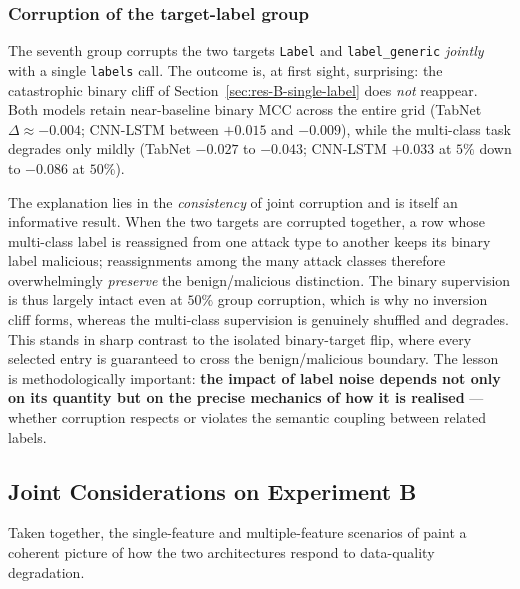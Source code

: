 \documentclass[../main.tex]{subfiles}
\begin{document}
\subsubsection{Corruption of the target-label group}
\label{sec:res-B-multi-label}

The seventh group corrupts the two targets \texttt{Label} and \texttt{label\_generic} \emph{jointly} with a single \texttt{labels} call. The outcome is, at first sight, surprising: the catastrophic binary cliff of Section~\ref{sec:res-B-single-label} does \emph{not} reappear. Both models retain near-baseline binary MCC across the entire grid (TabNet $\Delta \approx -0.004$; CNN-LSTM between $+0.015$ and $-0.009$), while the multi-class task degrades only mildly (TabNet $-0.027$ to $-0.043$; CNN-LSTM $+0.033$ at $5\%$ down to $-0.086$ at $50\%$).

The explanation lies in the \emph{consistency} of joint corruption and is itself an informative result. When the two targets are corrupted together, a row whose multi-class label is reassigned from one attack type to another keeps its binary label malicious; reassignments among the many attack classes therefore overwhelmingly \emph{preserve} the benign/malicious distinction. The binary supervision is thus largely intact even at $50\%$ group corruption, which is why no inversion cliff forms, whereas the multi-class supervision is genuinely shuffled and degrades. This stands in sharp contrast to the isolated binary-target flip, where every selected entry is guaranteed to cross the benign/malicious boundary. The lesson is methodologically important: \textbf{the impact of label noise depends not only on its quantity but on the precise mechanics of how it is realised} --- whether corruption respects or violates the semantic coupling between related labels.

\newpage
\subsection{Joint Considerations on Experiment B}
\label{sec: Cumulative BreakEven Point Test}

Taken together, the single-feature and multiple-feature scenarios of  paint a coherent picture of how the two architectures respond to data-quality degradation.
\end{document}
